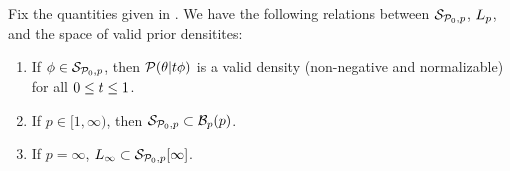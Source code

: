 %
%
%
%
%
%



\begin{lem}
%
Fix the quantities given in .  We have the following
relations between $\mathcal{S}_{\mathcal{P}_{0},p}$, ${L_{p}}$, and the space of valid
prior densitites:
%
\begin{enumerate}
%
    \item If $\phi \in \mathcal{S}_{\mathcal{P}_{0},p}$, then $\mathcal{P}(\theta \vert t \phi)$ is a valid
    density (non-negative and normalizable) for all $0 \le t \le 1$.
%
    \item If $p \in [1, \infty)$, then $\mathcal{S}_{\mathcal{P}_{0},p} \subset
        \mathcal{B}_{p}(p)$.
%
    \item If $p = \infty$, ${L_{\infty}} \subset \mathcal{S}_{\mathcal{P}_{0},p}[\infty]$.
%
%
\end{enumerate}
%
\end{lem}

